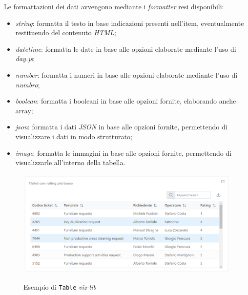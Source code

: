 Le formattazioni dei dati avvengono mediante i \textit{formatter} resi disponibili:
\begin{itemize}
    \item \textit{string}: formatta il testo in base indicazioni presenti nell'item, eventualmente restituendo del contenuto \textit{HTML};
    \item \textit{datetime}: formatta le date in base alle opzioni elaborate mediante l'uso di \textit{day.js};
    \item \textit{number}: formatta i numeri in base alle opzioni elaborate mediante l'uso di \textit{numbro};
    \item \textit{boolean}: formatta i booleani in base alle opzioni fornite, elaborando anche array;
    \item \textit{json}: formatta i dati \textit{JSON} in base alle opzioni fornite, permettendo di visualizzare i dati in modo strutturato;
    \item \textit{image}: formatta le immagini in base alle opzioni fornite, permettendo di visualizzarle all'interno della tabella.
\end{itemize}

\begin{figure}[H]
    \centering
    \includegraphics[alt={Esempio di Table viz-lib}, width=1 \columnwidth, height=\maxdimen, keepaspectratio]{img/ex_table.png}
    \caption{Esempio di \texttt{Table} \textit{viz-lib}}
    \label{fig:table-example}
\end{figure}

